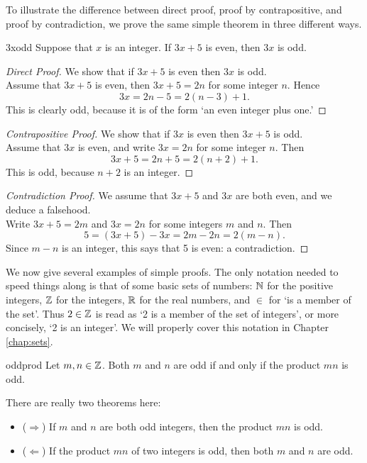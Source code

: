  To illustrate the difference between direct proof, proof by contrapositive, and proof by contradiction, we prove the same simple theorem in three different ways. 


\begin{thm}{}{3xodd}
Suppose that $x$ is an integer. If $3x+5$ is even, then $3x$ is odd.
\end{thm}

\begin{proof}[Direct Proof]
We show that if $3x+5$ is even then $3x$ is odd.\\[5pt]
Assume that $3x+5$ is even, then $3x+5=2n$ for some integer $n$. Hence
\[3x=2n-5=2(n-3)+1.\]
This is clearly odd, because it is of the form `an even integer plus one.'
\end{proof}

\begin{proof}[Contrapositive Proof]
We show that if $3x$ is even then $3x+5$ is odd.\\[5pt]
Assume that $3x$ is even, and write $3x=2n$ for some integer $n$. Then
\[3x+5=2n+5=2(n+2)+1.\]
This is odd, because $n+2$ is an integer.
\end{proof}

\begin{proof}[Contradiction Proof]
We assume that $3x+5$ and $3x$ are both even, and we deduce a falsehood.\\[5pt]
Write $3x+5=2m$ and $3x=2n$ for some integers $m$ and $n$. Then
\[5=(3x+5)-3x=2m-2n=2(m-n).\]
Since $m-n$ is an integer, this says that 5 is even: a contradiction.
\end{proof}



We now give several examples of simple proofs. The only notation needed to speed things along is that of some basic sets of numbers: $\mathbb{N}$ for the positive integers, $\mathbb{Z}$ for the integers, $\mathbb{R}$ for the real numbers, and $\in$ for `is a member of the set'. Thus $2\in\mathbb{Z}$ is read as `2 is a member of the set of integers', or more concisely, `2 is an integer'. We will properly cover this notation in Chapter \ref{chap:sets}.

\begin{thm}{}{oddprod}
Let $m,n\in\mathbb{Z}$. Both $m$ and $n$ are odd if and only if the product $mn$ is odd.
\end{thm}

 There are really two theorems here:
\begin{itemize}
\item[]{($\Rightarrow$)} If $m$ and $n$ are both odd integers, then the product $mn$ is odd.
\item[]{($\Leftarrow$)} If the product $mn$ of two integers is odd, then both $m$ and $n$ are odd.
 \end{itemize}
 
